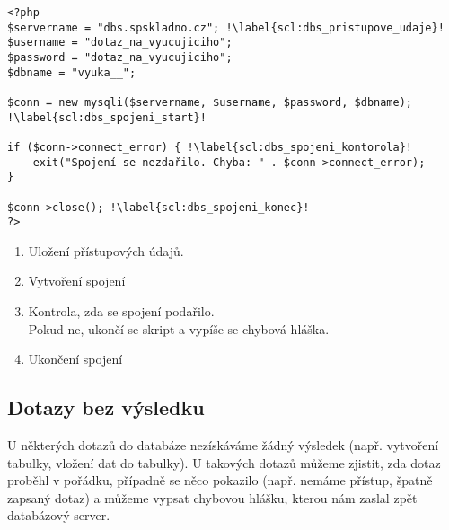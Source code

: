 \begin{minipage}[t]{.45\textwidth}
\begin{code}
\begin{verbatim}
<?php
$servername = "dbs.spskladno.cz"; !\label{scl:dbs_pristupove_udaje}!
$username = "dotaz_na_vyucujiciho";
$password = "dotaz_na_vyucujiciho";
$dbname = "vyuka__";

$conn = new mysqli($servername, $username, $password, $dbname); !\label{scl:dbs_spojeni_start}!

if ($conn->connect_error) { !\label{scl:dbs_spojeni_kontorola}!
    exit("Spojení se nezdařilo. Chyba: " . $conn->connect_error);
}

$conn->close(); !\label{scl:dbs_spojeni_konec}!
?> 
\end{verbatim}

\label{code:php_dbs_spojeni}
\end{code}
\end{minipage}
\begin{minipage}[t]{.45\textwidth}
\begin{enumerate}
\item[ř. \ref{scl:dbs_pristupove_udaje}:] Uložení přístupových údajů.
\item[ř. \ref{scl:dbs_spojeni_start}:] Vytvoření spojení 
\item[ř. \ref{scl:dbs_spojeni_kontorola}:] Kontrola, zda se spojení podařilo.\\
Pokud ne, ukončí se skript a vypíše se chybová hláška.
\vspace{2cm}
\item[ř. \ref{scl:dbs_spojeni_konec}:] Ukončení spojení 
\end{enumerate}
\end{minipage} 

\subsection{Dotazy bez výsledku}
U některých dotazů do databáze nezískáváme žádný výsledek (např. vytvoření tabulky, vložení dat do tabulky). U takových dotazů můžeme zjistit, zda dotaz proběhl v pořádku, případně se něco pokazilo (např. nemáme přístup, špatně zapsaný dotaz) a můžeme vypsat chybovou hlášku, kterou nám zaslal zpět databázový server.\\

